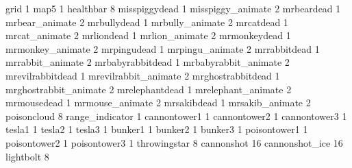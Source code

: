 grid 1
map5 1
healthbar 8
misspiggydead 1
misspiggy_animate 2
mrbeardead 1
mrbear_animate 2
mrbullydead 1
mrbully_animate 2
mrcatdead 1
mrcat_animate 2
mrliondead 1
mrlion_animate 2
mrmonkeydead 1
mrmonkey_animate 2
mrpingudead 1
mrpingu_animate 2
mrrabbitdead 1
mrrabbit_animate 2
mrbabyrabbitdead 1
mrbabyrabbit_animate 2
mrevilrabbitdead 1
mrevilrabbit_animate 2
mrghostrabbitdead 1
mrghostrabbit_animate 2
mrelephantdead 1
mrelephant_animate 2
mrmousedead 1
mrmouse_animate 2
mrsakibdead 1
mrsakib_animate 2
poisoncloud 8
range_indicator 1
cannontower1 1
cannontower2 1
cannontower3 1
tesla1 1
tesla2 1
tesla3 1
bunker1 1
bunker2 1
bunker3 1
poisontower1 1
poisontower2 1
poisontower3 1
throwingstar 8
cannonshot 16
cannonshot_ice 16
lightbolt 8
